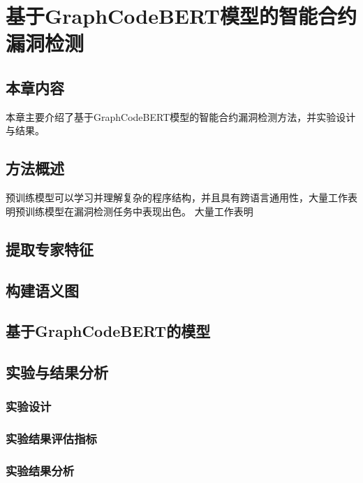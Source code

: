 \chapter{基于GraphCodeBERT模型的智能合约漏洞检测}
\section{本章内容}
本章主要介绍了基于GraphCodeBERT模型的智能合约漏洞检测方法，并实验设计与结果。
\section{方法概述}
预训练模型可以学习并理解复杂的程序结构，并且具有跨语言通用性，大量工作表明预训练模型在漏洞检测任务中表现出色\cite{}。
大量工作表明
\section{提取专家特征}

\section{构建语义图}

\section{基于GraphCodeBERT的模型}

\section{实验与结果分析}

\subsection{实验设计}

\subsection{实验结果评估指标}

\subsection{实验结果分析}
